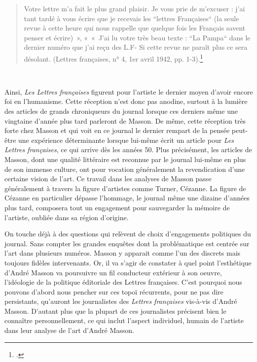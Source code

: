 {\begin{quote}
Votre lettre m’a fait le plus grand plaisir. Je vous prie de m’excuser : j’ai tant tardé à vous écrire que je recevais les “lettres Françaises“ (la seule revue à cette heure qui nous rappelle que quelque fois les Français savent penser et écrire) », « « J’ai lu votre très beau texte : “La Pampa“ dans le dernier numéro que j’ai reçu des L.F- Si cette revue ne paraît plus ce sera désolant. (Lettres françaises, n° 4, 1er avril 1942, pp. 1-3).\footcite[p478]{anneessurrealistes}
\end{quote}
 

	Ainsi, \emph{Les Lettres françaises }figurent pour l’artiste le dernier moyen d’avoir encore foi en l’humanisme. Cette réception n’est donc pas anodine, surtout à la lumière des articles de grands chroniqueurs du journal lorsque ces derniers même une vingtaine d’année plus tard parleront de Masson. De même, cette réception très forte chez Masson et qui voit en ce journal le dernier rempart de la pensée peut-être une expérience déterminante lorsque lui-même écrit un article pour \emph{Les Lettres françaises}, ce qui arrive dès les années 50. Plus précisément, les articles de Masson, dont une qualité littéraire est reconnue par le journal lui-même en plus de son immense culture, ont pour vocation généralement la revendication d’une certaine vision de l’art. Ce travail dans les analyses de Masson passe généralement à travers la figure d’artistes comme Turner, Cézanne. La figure de Cézanne en particulier dépasse l’hommage, le journal même une dizaine d’années plus tard, composera tout un engagement pour sauvegarder la mémoire de l’artiste, oubliée dans sa région d’origine. 

On touche déjà à des questions qui relèvent de choix d’engagements politiques du journal. Sans compter les grandes enquêtes dont la problématique est centrée sur l’art dans plusieurs numéros. Masson y apparait comme l’un des discrets mais toujours fidèles intervenants. Or, il va s’agir de constater à quel point l’esthétique d’André Masson va poursuivre un fil conducteur extérieur à son oeuvre, l’idéologie de la politique éditoriale des Lettres françaises. C’est pourquoi nous pouvons d’abord nous pencher sur ces topoï récurrents, pour ne pas dire persistants, qu’auront les journalistes des \emph{Lettres françaises} vis-à-vis d’André Masson. D’autant plus que la plupart de ces journalistes précisent bien le connaître personnellement, ce qui inclut l’aspect individuel, humain de l’artiste dans leur analyse de l’art d’André Masson. 

}
